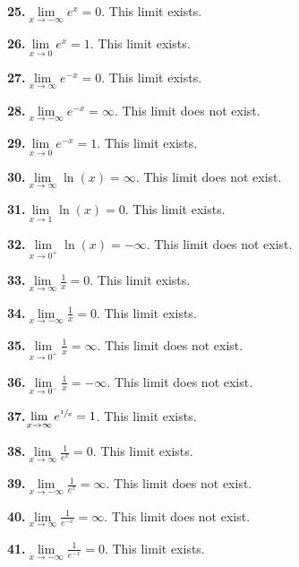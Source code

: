 \documentclass[12pt,]{book}
\theoremstyle{plain}
\theoremstyle{definition}
\theoremstyle{definition}
\theoremstyle{definition}
\theoremstyle{definition}
\theoremstyle{definition}
\numberwithin{equation}{section}
\newcommand{\fe}[2]{#1\mathopen{}\left(#2\right)\mathclose{}}
\begin{document}
\noindent\textbf{25.}\quad{}\(\lim\limits_{x\to-\infty}e^x=0\). This limit exists.%
\par\smallskip
\noindent\textbf{26.}\quad{}\(\lim\limits_{x\to0}e^x=1\). This limit exists.%
\par\smallskip
\noindent\textbf{27.}\quad{}\(\lim\limits_{x\to\infty}e^{-x}=0\). This limit exists.%
\par\smallskip
\noindent\textbf{28.}\quad{}\(\lim\limits_{x\to-\infty}e^{-x}=\infty\). This limit does not exist.%
\par\smallskip
\noindent\textbf{29.}\quad{}\(\lim\limits_{x\to0}e^{-x}=1\). This limit exists.%
\par\smallskip
\noindent\textbf{30.}\quad{}\(\lim\limits_{x\to\infty}\fe{\ln}{x}=\infty\). This limit does not exist.%
\par\smallskip
\noindent\textbf{31.}\quad{}\(\lim\limits_{x\to1}\fe{\ln}{x}=0\). This limit exists.%
\par\smallskip
\noindent\textbf{32.}\quad{}\(\lim\limits_{x\to0^{+}}\fe{\ln}{x}=-\infty\). This limit does not exist.%
\par\smallskip
\noindent\textbf{33.}\quad{}\(\lim\limits_{x\to\infty}\frac{1}{x}=0\). This limit exists.%
\par\smallskip
\noindent\textbf{34.}\quad{}\(\lim\limits_{x\to-\infty}\frac{1}{x}=0\). This limit exists.%
\par\smallskip
\noindent\textbf{35.}\quad{}\(\lim\limits_{x\to0^{+}}\frac{1}{x}=\infty\). This limit does not exist.%
\par\smallskip
\noindent\textbf{36.}\quad{}\(\lim\limits_{x\to0^{-}}\frac{1}{x}=-\infty\). This limit does not exist.%
\par\smallskip
\noindent\textbf{37.}\quad{}\(\lim\limits_{x\to\infty}e^{\sfrac{1}{x}}=1\). This limit exists.%
\par\smallskip
\noindent\textbf{38.}\quad{}\(\lim\limits_{x\to\infty}\frac{1}{e^x}=0\). This limit exists.%
\par\smallskip
\noindent\textbf{39.}\quad{}\(\lim\limits_{x\to-\infty}\frac{1}{e^x}=\infty\). This limit does not exist.%
\par\smallskip
\noindent\textbf{40.}\quad{}\(\lim\limits_{x\to\infty}\frac{1}{e^{-x}}=\infty\). This limit does not exist.%
\par\smallskip
\noindent\textbf{41.}\quad{}\(\lim\limits_{x\to-\infty}\frac{1}{e^{-x}}=0\). This limit exists.%
\par\smallskip
%
\backmatter
%
\end{document}
